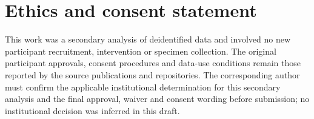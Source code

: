 \section*{Ethics and consent statement}

This work was a secondary analysis of deidentified data and involved no new participant
recruitment, intervention or specimen collection. The original participant approvals,
consent procedures and data-use conditions remain those reported by the source publications
and repositories. The corresponding author must confirm the applicable institutional
determination for this secondary analysis and the final approval, waiver and consent wording
before submission; no institutional decision was inferred in this draft.
